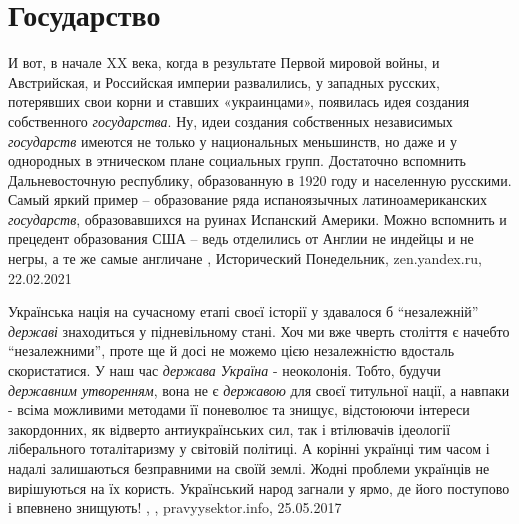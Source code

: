  
 
 
 
 
\chapter{Государство}
\label{sec:slova.gosudarstvo}

И вот, в начале XX века, когда в результате Первой мировой войны, и
Австрийская, и Российская империи развалились, у западных русских, потерявших
свои корни и ставших «украинцами», появилась идея создания собственного
\emph{государства}. Ну, идеи создания собственных независимых \emph{государств} имеются не
только у национальных меньшинств, но даже и у однородных в этническом плане
социальных групп. Достаточно вспомнить Дальневосточную республику, образованную
в 1920 году и населенную русскими. Самый яркий пример – образование ряда
испаноязычных латиноамериканских \emph{государств}, образовавшихся на руинах Испанский
Америки. Можно вспомнить и прецедент образования США – ведь отделились от
Англии не индейцы и не негры, а те же самые англичане
, 
Исторический Понедельник, zen.yandex.ru, 22.02.2021 

Українська нація на сучасному етапі своєї історії у здавалося б \enquote{незалежній}
\emph{державі} знаходиться у підневільному стані. Хоч ми вже чверть століття є начебто
\enquote{незалежними}, проте ще й досі не можемо цією незалежністю вдосталь
скористатися.  У наш час \emph{держава Україна} - неоколонія. Тобто, будучи \emph{державним
утворенням}, вона не є \emph{державою} для своєї титульної нації, а навпаки - всіма
можливими методами її поневолює та знищує, відстоюючи інтереси закордонних, як
відверто антиукраїнських сил, так і втілювачів ідеології ліберального
тоталітаризму у світовій політиці. А корінні українці тим часом і надалі
залишаються безправними на своїй землі. Жодні проблеми українців не вирішуються
на їх користь. Український народ загнали у ярмо, де його поступово і впевнено
знищують!
, 
, pravyysektor.info, 25.05.2017

